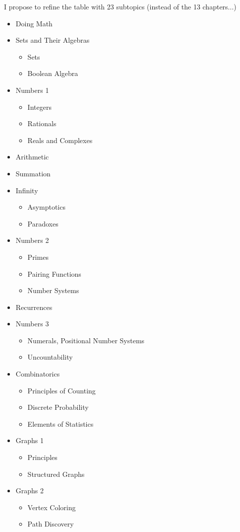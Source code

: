 \documentclass{article}
\begin{document}
I propose to refine the table with 23 subtopics (instead of the 13 chapters...)
\begin{itemize}
\item
Doing Math
\item
Sets and Their Algebras
\begin{itemize}
\item
Sets 
\item
Boolean Algebra
\end{itemize}
\item
Numbers 1
\begin{itemize}
\item
Integers 
\item
Rationals
\item Reals and Complexes
\end{itemize}
\item Arithmetic
\item Summation
\item Infinity
\begin{itemize}
\item
Asymptotics
\item
Paradoxes
\end{itemize}
\item Numbers 2
\begin{itemize}
\item
Primes 
\item
Pairing Functions
\item
Number Systems
\end{itemize}
\item Recurrences
\item
Numbers 3
\begin{itemize}
\item
Numerals, 
Positional Number Systems
\item
Uncountability
\end{itemize}
\item
Combinatorics
\begin{itemize}
\item
Principles of Counting
\item
Discrete Probability
\item
Elements of Statistics
\end{itemize}
\item Graphs 1
\begin{itemize}
\item
Principles
\item
Structured Graphs
\end{itemize}
\item Graphs 2
\begin{itemize}
\item
Vertex Coloring 
\item
Path Discovery
\end{itemize}
\end{itemize}
\bigskip
\end{document}
